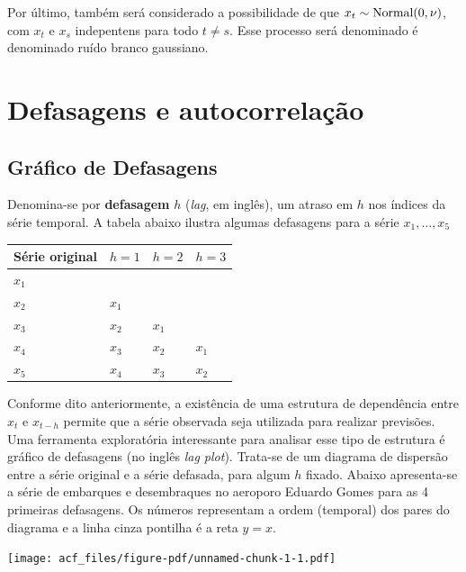 \documentclass[
  letterpaper,
  DIV=11,
  numbers=noendperiod]{scrreprt}
\theoremstyle{plain}
\theoremstyle{definition}
\theoremstyle{definition}
\theoremstyle{remark}
\begin{document}
Por último, também será considerado a possibilidade de que
\(x_t\sim\hbox{Normal}(0,\nu)\), com \(x_t\) e \(x_s\) indepentens para
todo \(t\neq s\). Esse processo será denominado é denominado ruído
branco gaussiano.


\hypertarget{defasagens-e-autocorrelauxe7uxe3o}{%
\chapter{Defasagens e
autocorrelação}\label{defasagens-e-autocorrelauxe7uxe3o}}

\hypertarget{gruxe1fico-de-defasagens}{%
\section{Gráfico de Defasagens}\label{gruxe1fico-de-defasagens}}

Denomina-se por \textbf{defasagem} \(h\) (\emph{lag}, em inglês), um
atraso em \(h\) nos índices da série temporal. A tabela abaixo ilustra
algumas defasagens para a série \(x_1,\ldots,x_5\)

\begin{longtable}[]{@{}llll@{}}
\toprule\noalign{}
Série original & \(h=1\) & \(h=2\) & \(h=3\) \\
\midrule\noalign{}
\endhead
\bottomrule\noalign{}
\endlastfoot
\(x_1\) & & & \\
\(x_2\) & \(x_1\) & & \\
\(x_3\) & \(x_2\) & \(x_1\) & \\
\(x_4\) & \(x_3\) & \(x_2\) & \(x_1\) \\
\(x_5\) & \(x_4\) & \(x_3\) & \(x_2\) \\
\end{longtable}

Conforme dito anteriormente, a existência de uma estrutura de
dependência entre \(x_t\) e \(x_{t-h}\) permite que a série observada
seja utilizada para realizar previsões. Uma ferramenta exploratória
interessante para analisar esse tipo de estrutura é gráfico de
defasagens (no inglês \emph{lag plot}). Trata-se de um diagrama de
dispersão entre a série original e a série defasada, para algum \(h\)
fixado. Abaixo apresenta-se a série de embarques e desembraques no
aeroporo Eduardo Gomes para as 4 primeiras defasagens. Os números
representam a ordem (temporal) dos pares do diagrama e a linha cinza
pontilha é a reta \(y=x\).

\texttt{[image: acf\_files/figure-pdf/unnamed-chunk-1-1.pdf]}
\end{document}

